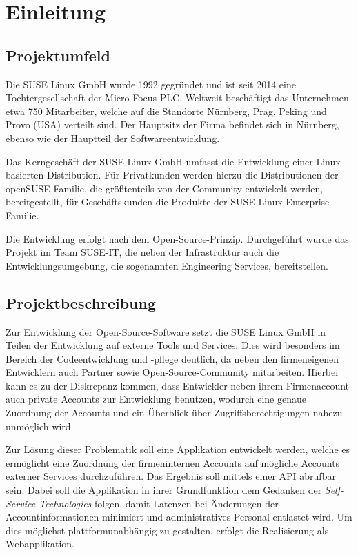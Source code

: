 \section{Einleitung}
\label{sec:Einleitung}

\subsection{Projektumfeld}
\label{sec:Projektumfeld}
Die SUSE Linux GmbH wurde 1992 gegründet und ist seit 2014 eine Tochtergesellschaft der Micro Focus
PLC. Weltweit beschäftigt das Unternehmen etwa 750 Mitarbeiter, welche auf die Standorte Nürnberg,
Prag, Peking und Provo (USA) verteilt sind. Der Hauptsitz der Firma befindet sich in Nürnberg,
ebenso wie der Hauptteil der Softwareentwicklung.

Das Kerngeschäft der SUSE Linux GmbH umfasst die Entwicklung einer Linux-basierten Distribution.
Für Privatkunden werden hierzu die Distributionen der openSUSE-Familie, die größtenteils von der
Community entwickelt werden, bereitgestellt, für Geschäftskunden die Produkte der SUSE Linux
Enterprise-Familie.

Die Entwicklung erfolgt nach dem Open-Source-Prinzip.
Durchgeführt wurde das Projekt im Team SUSE-IT, die neben der Infrastruktur auch die
Entwicklungsumgebung, die sogenannten Engineering Services, bereitstellen.

\subsection{Projektbeschreibung}
\label{sec:Projektbeschreibung}
Zur Entwicklung der Open-Source-Software setzt die SUSE Linux GmbH in Teilen der Entwicklung
auf externe Tools und Services. Dies wird besonders im Bereich der Codeentwicklung und -pflege
deutlich, da neben den firmeneigenen Entwicklern auch Partner sowie Open-Source-Community
mitarbeiten. Hierbei kann es zu der Diskrepanz kommen, dass Entwickler neben ihrem Firmenaccount
auch private Accounts zur Entwicklung benutzen, wodurch eine genaue Zuordnung der Accounts und
ein Überblick über Zugriffsberechtigungen nahezu unmöglich wird.

Zur Lösung dieser Problematik soll eine Applikation entwickelt werden, welche es ermöglicht
eine Zuordnung der firmeninternen Accounts auf mögliche Accounts externer Services durchzuführen.
Das Ergebnis soll mittels einer \acs{API} abrufbar sein.
Dabei soll die Applikation in ihrer Grundfunktion dem Gedanken der \textit{Self-Service-Technologies} folgen,
damit Latenzen bei Änderungen der Accountinformationen minimiert und administratives Personal
entlastet wird. Um dies möglichst plattformunabhängig zu gestalten, erfolgt die Realisierung als
Webapplikation.

